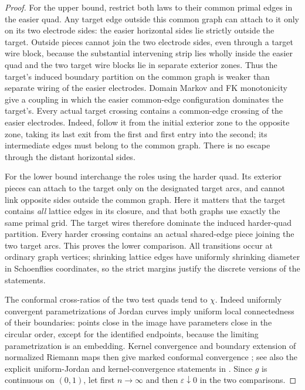 \begin{proof}


For the upper bound, restrict both laws to their common primal edges
in the easier quad.  Any target edge outside this common graph can
attach to it only on its two electrode sides: the easier horizontal
sides lie strictly outside the target.  Outside pieces cannot join
the two electrode sides, even through a target wire block, because
the substantial intervening strip lies wholly inside the easier quad
and the two target wire blocks lie in separate exterior zones.
Thus the target's induced boundary partition on the common graph is
weaker than separate wiring of the easier electrodes.  Domain Markov
and FK monotonicity give a coupling in which the easier common-edge
configuration dominates the target's.  Every actual target crossing
contains a common-edge crossing of the easier electrodes.  Indeed,
follow it from the initial exterior zone to the opposite zone, taking
its last exit from the first and first entry into the second; its
intermediate edges must belong to the common graph.  There is no
escape through the distant horizontal sides.

For the lower bound interchange the roles using the harder quad.
Its exterior pieces can attach to the target only on the designated
target arcs, and cannot link opposite sides outside the common graph.
Here it matters that the target contains \emph{all} lattice edges in
its closure, and that both graphs use exactly the same primal grid.
The target wires therefore dominate the induced harder-quad
partition.  Every harder crossing contains an actual shared-edge
piece joining the two target arcs.  This proves the lower comparison.
All transitions occur at ordinary graph vertices; shrinking lattice
edges have uniformly shrinking diameter in Schoenflies coordinates,
so the strict margins justify the discrete versions of the statements.

The conformal cross-ratios of the two test quads tend to $\chi$.
Indeed uniformly convergent parametrizations of Jordan curves imply
uniform local connectedness of their boundaries: points close in the
image have parameters close in the circular order, except for the
identified endpoints, because the limiting parametrization is an
embedding.  Kernel convergence and boundary extension of normalized
Riemann maps then give marked conformal convergence
\citep{Pommerenke1992}; see also the explicit uniform-Jordan and kernel-convergence statements in \citet[Appendix~A, Theorems~6--8 and Corollaries~A.1--A.2]{CamiaNewman2006Convergence}.  Since $g$ is continuous on $(0,1)$, let first
$n\to\infty$ and then $\varepsilon\downarrow0$ in the two comparisons.
\end{proof}

